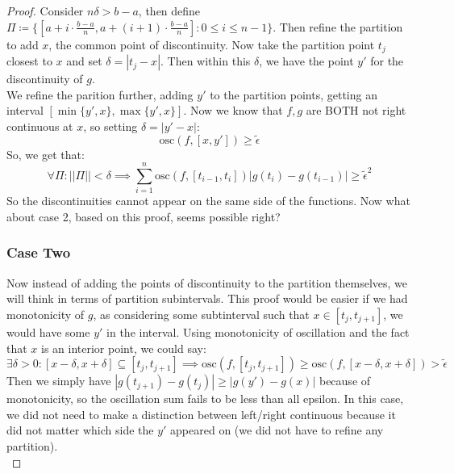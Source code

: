 \documentclass[10pt,letterpaper]{article} %
\begin{document}
\begin{proof}
Consider $n\delta > b-a$, then define $\Pi \coloneq \{[a + i \cdot \frac{b-a}{n}, a + (i+1) \cdot \frac{b-a}{n}] : 0 \leqslant i \leqslant n-1\}$. Then refine the partition to add $x$, the common point of discontinuity. Now take the partition point $t_j$ closest to $x$ and set $\delta = |t_j - x|$. Then within this $\delta$, we have the point $y'$ for the discontinuity of $g$.\\

We refine the parition further, adding $y'$ to the partition points, getting an interval $[\min\{y', x\}, \max\{y', x\}]$. Now we know that $f, g$ are BOTH not right continuous at $x$, so setting $\delta = |y' - x|$:
\begin{equation*}
  \text{osc}(f, [x, y']) \geqslant \tilde{\epsilon}
\end{equation*}
So, we get that:
\begin{equation*}
  \forall \Pi: ||\Pi|| < \delta \implies \sum_{i=1}^{n}\text{osc}(f, [t_{i-1}, t_i])|g(t_i) - g(t_{i-1})| \geqslant \tilde{\epsilon}^2
\end{equation*}
So the discontinuities cannot appear on the same side of the functions. Now what about case 2, based on this proof, seems possible right?

\subsubsection*{Case Two}
Now instead of adding the points of discontinuity to the partition themselves, we will think in terms of partition subintervals. This proof would be easier if we had monotonicity of $g$, as considering some subtinterval such that $x \in [t_j, t_{j+1}]$, we would have some $y'$ in the interval. Using monotonicity of oscillation and the fact that $x$ is an interior point, we could say:
\begin{equation*}
  \exists \delta > 0: [x - \delta, x + \delta] \subseteq [t_j, t_{j+1}] \implies \text{osc}(f, [t_j, t_{j+1}]) \geqslant \text{osc}(f, [x - \delta, x + \delta]) > \tilde{\epsilon}
\end{equation*}
Then we simply have $|g(t_{j+1}) - g(t_j)| \geqslant |g(y') - g(x)|$ because of monotonicity, so the oscillation sum fails to be less than all epsilon. In this case, we did not need to make a distinction between left/right continuous because it did not matter which side the $y'$ appeared on (we did not have to refine any partition).\\


\end{proof}
\end{document}
